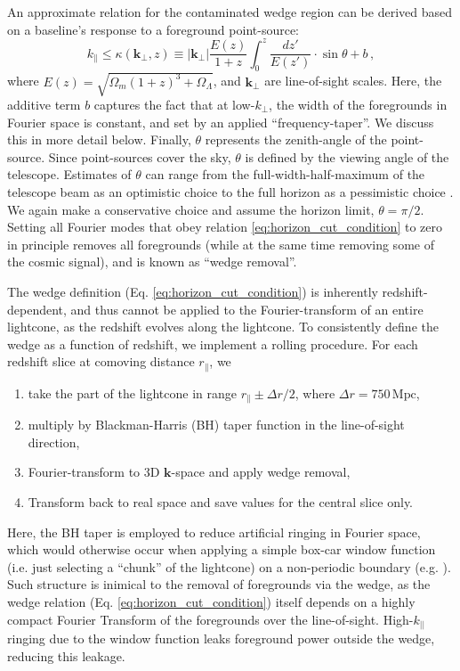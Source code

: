 \documentclass[fleqn,usenatbib]{mnras}
\renewcommand{\b}{\mathbf}
\begin{document}
An approximate relation for the contaminated wedge region \cite[e.g.][]{Morales2012,Vedantham2012,Trott2012,Parsons2014,Liu2014a,Liu2014b,wedge_murray} can be derived based on a baseline's response to a foreground point-source:
\begin{equation}
    k_{\|} \le \kappa(\b{k}_\perp, z) \equiv |\b{k}_\perp| \frac{E(z)}{1+z} \int_0^z \frac{dz'}{E(z')} \cdot \sin\theta + b \, ,
    \label{eq:horizon_cut_condition}
\end{equation}
where $E(z)=\sqrt{\Omega_m (1+z)^3 + \Omega_\Lambda}$, and $\b{k}_\perp$ are line-of-sight scales. 
Here, the additive term $b$ captures the fact that at low-$k_\perp$, the width of the foregrounds in Fourier space is constant, and set by an applied \enquote{frequency-taper}. We discuss this in more detail below. 
Finally, $\theta$ represents the zenith-angle of the point-source.  Since point-sources cover the sky, $\theta$ is defined by the viewing angle of the telescope.  Estimates of $\theta$ can range from the full-width-half-maximum of the telescope beam as an optimistic choice to the full horizon as a pessimistic choice \citep[cf.][]{Pober2014}.  We again make a conservative choice and assume the horizon limit, $\theta = \pi/2$.
Setting all Fourier modes that obey relation \ref{eq:horizon_cut_condition} to zero in principle removes all foregrounds (while at the same time removing some of the cosmic signal), and is known as \enquote{wedge removal}.

The wedge definition (Eq. \ref{eq:horizon_cut_condition}) is inherently redshift-dependent, and thus cannot be applied to the Fourier-transform of an entire lightcone, as the redshift evolves along the lightcone. To consistently define the wedge as a function of redshift, we implement a rolling procedure. For each redshift slice at comoving distance $r_{\|}$, we
\begin{enumerate}
    \item take the part of the lightcone in range $r_{\|} \pm \Delta r/2$, where $\Delta r = 750\, \mathrm{Mpc}$,
    \item multiply by Blackman-Harris (BH) taper function in the line-of-sight direction,
    \item Fourier-transform to 3D $\b{k}$-space and apply wedge removal,
    \item Transform back to real space and save values for the central slice only.\footnotemark
\end{enumerate}
Here, the BH taper is employed to reduce artificial ringing in Fourier space, which would otherwise occur when applying a simple box-car window function (i.e. just selecting a \enquote{chunk} of the lightcone) on a non-periodic boundary (e.g. \citealt{choudhuri2016visibility,trott2016chips}).
Such structure is inimical to the removal of foregrounds via the wedge, as the wedge relation (Eq. \ref{eq:horizon_cut_condition}) itself depends on a highly compact Fourier Transform of the foregrounds over the line-of-sight. High-$k_{||}$ ringing due to the window function leaks foreground power outside the wedge, reducing this leakage.
\end{document}

